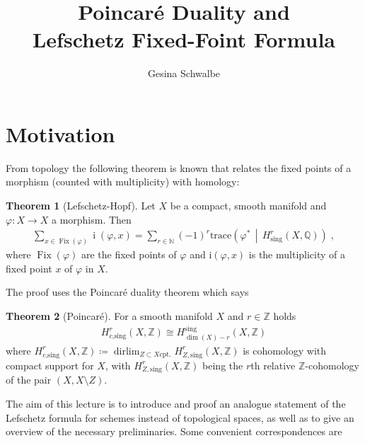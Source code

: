 \documentclass[english]{scrartcl}
\theoremstyle{definition}
\newtheorem*{Thm*}{Theorem}
\theoremstyle{remark}
\newcommand*{\N}{\mathds{N}}
\newcommand*{\Z}{\mathds{Z}}
\newcommand*{\Q}{\mathds{Q}}
\DeclareMathOperator*{\dirlim}{dirlim} %
\newcommand*{\trace}[2]{{\text{trace}\left(#1 \,\middle|\, #2 \right)}} %
\renewcommand*{\phi}{\varphi}
\begin{document}
\clearpairofpagestyles
{}
\cfoot*{\pagemark}

\title{Poincaré Duality and\\
  Lefschetz Fixed-Foint Formula}
\subject{Seminar:
  Deligne's proof of the Weil Conjecture%
}
\author{Gesina Schwalbe}
\maketitle
\tableofcontents

\section{Motivation}
From topology the following theorem is known that relates the fixed
points of a morphism (counted with multiplicity) with homology:
\begin{Thm*}[Lefschetz-Hopf]
  Let $X$ be a compact, smooth manifold and
  $\phi\colon X\to X$ a morphism. Then
  \begin{gather*}
    \sum_{x\in\operatorname{Fix}(\phi)} \operatorname{i}(\phi,x)
    =\sum_{r\in\N}(-1)^r \trace{\phi^*}{H_\text{sing}^r(X,\Q)}\;,
  \end{gather*}
  where $\operatorname{Fix}(\phi)$ are the fixed points of $\phi$ and
  $\mathrm i(\phi,x)$ is the multiplicity of a fixed point $x$ of $\phi$
  in $X$.
\end{Thm*}
The proof uses the Poincaré duality theorem which says
\begin{Thm*}[Poincaré]
  For a smooth manifold $X$ and $r\in\Z$ holds
  \begin{gather*}
    H_{c\text{,sing}}^r(X,\Z) \cong H_{\dim(X)-r}^{\text{sing}}(X,\Z)
  \end{gather*}
  where $H_{c\text{,sing}}^r(X,\Z)\coloneqq
  \dirlim_{Z\subset X \text{cpt.}}H_{Z,\text{sing}}^r(X,\Z)$
  is cohomology with compact support for $X$,
  with $H_{Z,\text{sing}}^r(X,\Z)$ being the $r$th relative
  $\Z$-cohomology of the pair $(X,X\setminus Z)$.
\end{Thm*}
The aim of this lecture is to introduce and proof an analogue
statement of the Lefschetz formula for schemes instead of topological
spaces, as well as to give an overview of the necessary preliminaries.
Some convenient correspondences are
\end{document}
